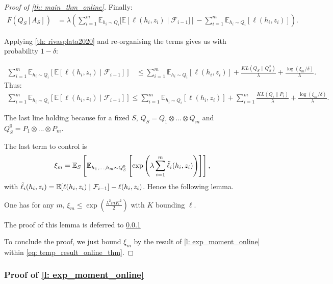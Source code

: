 \begin{noaddcontents}
\begin{proof}[Proof of \cref{th: main_thm_online}]
Finally:
\begin{align*}
      F(Q_S[A_S])&= \lambda \left(\sum_{i=1}^m \mathbb{E}_{h_i\sim Q_i}[\mathbb{E}\left[\ell(h_i,z_i)\mid \mathcal{F}_{i-1}]\right]- \sum_{i=1}^m \mathbb{E}_{h_i\sim Q_i}[\ell(h_i,z_i)] \right).
\end{align*}


Applying \cref{th: rivasplata2020} and re-organising the terms gives us with probability $1-\delta$:

\begin{align*}
\sum_{i=1}^m \mathbb{E}_{h_i\sim Q_i}\left[\mathbb{E}[\ell(h_i,z_i)\mid \mathcal{F}_{i-1}]\right] & \leq \sum_{i=1}^m \mathbb{E}_{h_i\sim Q_i}[\ell(h_i,z_i)] + \frac{KL(Q_S\|Q^0_S)}{\lambda} + \frac{\log(\xi_m/\delta)}{\lambda}.
\end{align*}
\noindent Thus:
\begin{align}
  \label{eq: temp_result_online_thm}
 \sum_{i=1}^m \mathbb{E}_{h_i\sim Q_i}\left[\mathbb{E}[\ell(h_i,z_i)\mid \mathcal{F}_{i-1}]\right] \leq \sum_{i=1}^m \mathbb{E}_{h_i\sim Q_i}[\ell(h_i,z_i)] + \sum_{i=1}^m \frac{KL(Q_i\|P_i)}{\lambda} + \frac{\log(\xi_m/\delta)}{\lambda}.
\end{align}

\noindent The last line holding because for a fixed $S$, $Q_S= Q_1\otimes...\otimes Q_m$ and $Q_S^0= P_1\otimes...\otimes P_m$.

\noindent The last term to control is
\begin{align*}
\xi_m = \mathbb{E}_S\left[\mathbb{E}_{h_1,...,h_m \sim Q^0_S} \left[\exp\left(\lambda \sum_{i=1}^m \Tilde{\ell}_i(h_i,z_i)\right)\right]\right],
\end{align*}
with $\Tilde{\ell}_i(h_i,z_i)= \mathbb{E}[\ell(h_i,z_i)\mid \mathcal{F}_{i-1}]-  \ell(h_i,z_i)$. Hence the following lemma.

\begin{lemma}
\label{l: exp_moment_online}
One has for any $m$, $\xi_m \leq \exp\left(\frac{\lambda^2m K^2}{2}\right)$ with $K$ bounding $\ell$.
\end{lemma}

The proof of this lemma is deferred to \cref{sec: proof_exp_moment_online}


To conclude the proof, we just bound $\xi_m$ by the result of \cref{l: exp_moment_online} within \cref{eq: temp_result_online_thm}.
\end{proof}

\subsubsection{Proof of \cref{l: exp_moment_online}}
\label{sec: proof_exp_moment_online}



\end{noaddcontents}
